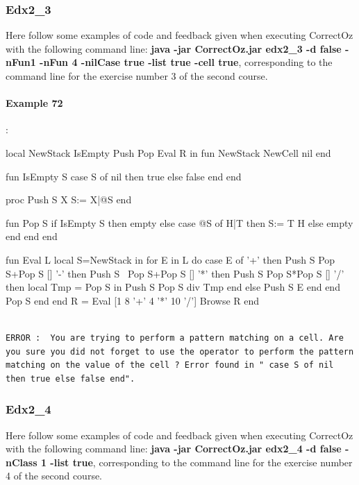 \documentclass[11pt,a4paper,twoside,openright]{report}
\begin{document}
\subsubsection{Edx2\_3}
Here follow some examples of code and feedback given when executing 
CorrectOz with the following command line: \textbf{java -jar CorrectOz.jar edx2\_3 
-d false -nFun1 -nFun 4 -nilCase true -list true -cell true}, corresponding 
to 
the command line for the exercise number 3 of the second course.


\paragraph{Example 72}:

\begin{OZ}
local NewStack IsEmpty Push Pop Eval R in
	fun {NewStack}
    	{NewCell nil}
  	end
  	
   	fun {IsEmpty S}
    	case S of nil then true
		else false
		end
   	end
   	
	proc {Push S X}
		S:= X|@S
	end
	
	fun {Pop S}
		if {IsEmpty S} then empty
		else
			case @S of H|T then
				S:= T
				H
			else
	 			empty
      		end
   		end
   	end
   	
	fun {Eval L}
		local S={NewStack} in
			for E in L do
				case E
				of '+' then {Push S {Pop S}+{Pop S}}
				[] '-' then {Push S ~{Pop S}+{Pop S}}
			 	[] '*' then {Push S {Pop S}*{Pop S}}
				[] '/' then		            
					local Tmp = {Pop S} in
				    	{Push S {Pop S} div Tmp}
				   	end
				else {Push S E}
				end
			end
			{Pop S}
		end
	end
		R = {Eval [1 8 '+' 4 '*' 10 '/'] }
	{Browse R}
end
\end{OZ}

\begin{lstlisting}

ERROR :  You are trying to perform a pattern matching on a cell. Are you sure you did not forget to use the operator to perform the pattern matching on the value of the cell ? Error found in " case S of nil then true else false end".

\end{lstlisting}

\subsubsection{Edx2\_4}
Here follow some examples of code and feedback given when executing 
CorrectOz with the following command line: \textbf{java -jar CorrectOz.jar edx2\_4 
-d false -nClass 1 -list true}, corresponding to the command line for the 
exercise number 4 of the second course.
\end{document}
